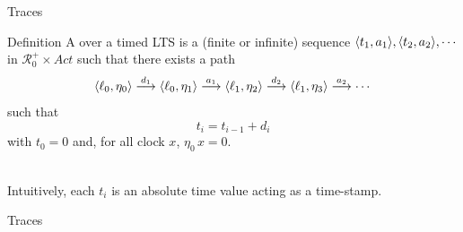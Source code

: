 \documentclass[aspectratio=169]{beamer}
\def\R{\mathcal{R}}
\def\TL#1{\mathcal{T}(#1)}
\def\tran#1{\stackrel{#1}{\longrightarrow}}
\begin{document}
\begin{slide}{Traces}
\small

\begin{block}{Definition}
A  over a \alert{timed LTS} is a (finite or infinite) sequence  $\langle t_1,a_1 \rangle, \langle t_2,a_2 \rangle, \cdots$ in
 $\R^+_0 \times Act$ such that there exists a path
\begin{equation*}
\pair{\ell_0,\eta_0}  \tran{d_1}   \pair{\ell_0,\eta_1}    \tran{a_1}     \pair{\ell_1,\eta_2}    \tran{d_2}    \pair{\ell_1,\eta_3}   \tran{a_2} \cdots 
\end{equation*}
such that 
\begin{equation*}
t_{i} = t_{i-1} + d_i
\end{equation*}
with $t_0=0$ and, for all clock $x$, $\eta_0\, x = 0$.
\end{block}
~\\

Intuitively, each $t_i$ is an absolute time value acting as a \alert{time-stamp}.

\end{slide}



\begin{frame}{Traces}
\end{frame}
\end{document}
